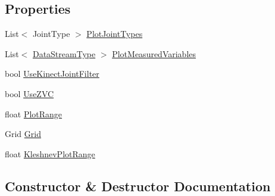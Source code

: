 \subsection*{Properties}
\begin{DoxyCompactItemize}
\item 
List$<$ Joint\+Type $>$ \hyperlink{class_rowing_monitor_1_1_view_model_1_1_rowing_monitor_view_model_a0c6130aa15345b26622dfaa5590666c5}{Plot\+Joint\+Types}
\item 
List$<$ \hyperlink{namespace_rowing_monitor_1_1_model_1_1_util_a01e1a06061533b246feb7421c9d0107f}{Data\+Stream\+Type} $>$ \hyperlink{class_rowing_monitor_1_1_view_model_1_1_rowing_monitor_view_model_ac01f574e88a7d89c1a587179cfd39828}{Plot\+Measured\+Variables}
\item 
bool \hyperlink{class_rowing_monitor_1_1_view_model_1_1_rowing_monitor_view_model_aa1c7347af05e006ced9ae63f6bbdfafb}{Use\+Kinect\+Joint\+Filter}
\item 
bool \hyperlink{class_rowing_monitor_1_1_view_model_1_1_rowing_monitor_view_model_a6764ca95c8ba917cd2b26b364fb86f84}{Use\+Z\+VC}
\item 
float \hyperlink{class_rowing_monitor_1_1_view_model_1_1_rowing_monitor_view_model_a8eabbb4dc7eb13de7dd37d130e2e5f9e}{Plot\+Range}
\item 
Grid \hyperlink{class_rowing_monitor_1_1_view_model_1_1_rowing_monitor_view_model_ad000acfb5b729f3d1b84d6cb98741810}{Grid}
\item 
float \hyperlink{class_rowing_monitor_1_1_view_model_1_1_rowing_monitor_view_model_a4fd0ce92e89eff66db5d305220b53ebf}{Kleshnev\+Plot\+Range}
\end{DoxyCompactItemize}


\subsection{Constructor \& Destructor Documentation}
\mbox{\label{class_rowing_monitor_1_1_view_model_1_1_rowing_monitor_view_model_aa0e18e83c39213b03349863966548e7c}} 
